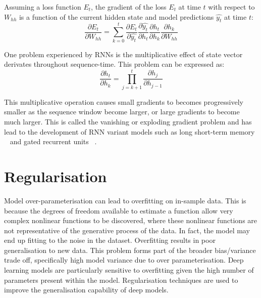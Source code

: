 \noindent Assuming a loss function $ E_t $, the gradient of the loss $E_t$ at time $t$ with respect to $W_{hh}$ is a function of the current hidden state and model predictions $\hat{y_t}$ at time $t$:  
\begin{equation}
	\frac{\partial E_t} {\partial W_{hh}} = \sum_{k=0}^{t}\frac{\partial E_t} {\partial \hat{y_t}}\frac{\partial \hat{y_t}} {\partial h_t}\frac{\partial h_t} {\partial h_k}\frac{\partial h_k} {\partial W_{hh}}
\end{equation}

\noindent One problem experienced by RNNs is the multiplicative effect of state vector derivates throughout sequence-time. This problem can be expressed as:
\begin{equation}
	\frac{\partial h_t} {\partial h_k} = \prod_{j=k+1}^t\frac{\partial h_j} {\partial h_{j-1}}
\end{equation}

\noindent This multiplicative operation causes small gradients to becomes progressively smaller as the sequence window become larger, or large gradients to become much larger. This is called the vanishing or exploding gradient problem and has lead to the development of RNN variant models such as long short-term memory \unskip ~\citep{hochreiter1997long} and gated recurrent units \unskip ~\citep{cho2014learning}.



\section{Regularisation}

Model over-parameterisation can lead to overfitting on in-sample data. This is because the degrees of freedom available to estimate a function allow very complex nonlinear functions to be discovered, where these nonlinear functions are not representative of the generative process of the data. In fact, the model may end up fitting to the noise in the dataset. Overfitting results in poor generalisation to new data. This problem forms part of the broader bias/variance trade off, specifically high model variance due to over parameterisation. Deep learning models are particularly sensitive to overfitting given the high number of parameters present within the model. Regularisation techniques are used to improve the generalisation capability of deep models. \par


